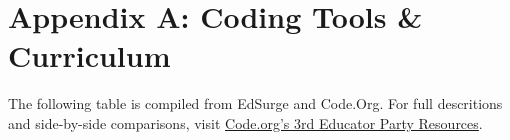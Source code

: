 
\chapter{Appendix A: Coding Tools \& Curriculum} %

\label{AppendixA} %


The following table is compiled from EdSurge\cite{edsurgetab} and Code.Org\cite{codeapps}. For full descritions and side-by-side comparisons, visit \href{https://code.org/educate/3rdparty}{Code.org's 3rd Educator Party Resources}.
\footnotesize
